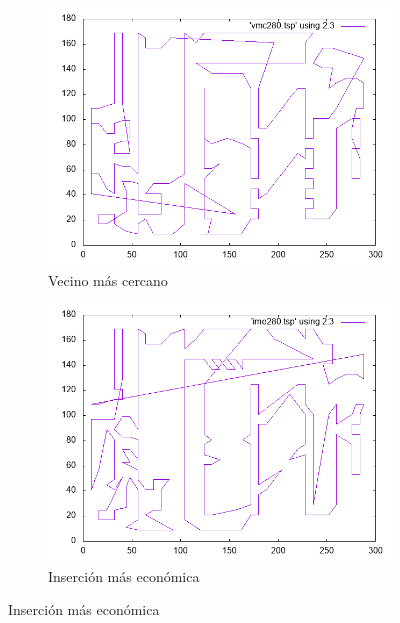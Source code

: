 \documentclass[12pt,spanish]{article}
\begin{document}
\begin{figure}[H]
\centering
\begin{subfigure}[b]{0.36\textwidth}
\includegraphics[width=\textwidth]{a280_vmc.png}
\caption{Vecino más cercano}
\end{subfigure}
\quad
\begin{subfigure}[b]{0.36\textwidth}
\includegraphics[width=\textwidth]{a280_ime.png}
\caption{Inserción más económica}
\end{subfigure}

\vspace{1cm}


\end{figure}
\end{document}
